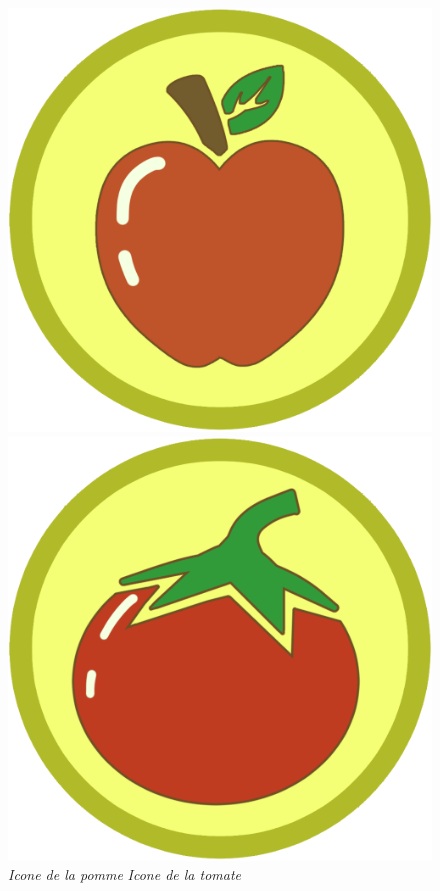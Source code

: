 \documentclass[12pt]{article}
\begin{document}
    \begin{figure}[h!]
        \centering
        \includegraphics[scale = 0.17]{static/Pomme.png}
        \hspace{2 cm}
        \includegraphics[scale = 0.17]{static/Tomate.png}\\
        \small{\emph{Icone de la pomme}}
        \hspace{5 cm}
        \small{\emph{Icone de la tomate}}
        \label{fig:Icones}
    \end{figure}
\end{document}
